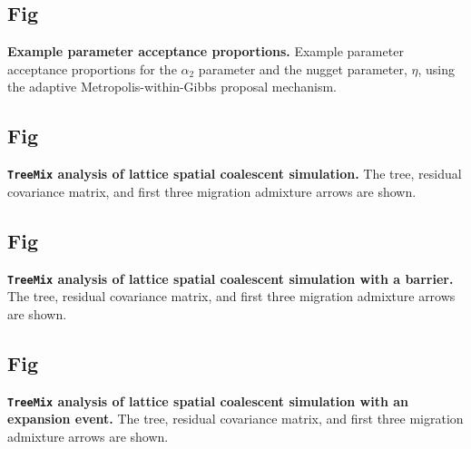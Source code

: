 \documentclass[10pt,letterpaper]{article}
\begin{document}
\subsection{Fig}
\label{sfig:example_acceptance_rates}
{\bf{
Example parameter acceptance proportions.}}
Example parameter acceptance proportions for the $\alpha_2$ parameter and the nugget parameter, 
$\eta$, using the adaptive Metropolis-within-Gibbs proposal mechanism.

\subsection{Fig}
\label{sfig:treemix_lattice}
{\bf{
\texttt{TreeMix} analysis of lattice spatial coalescent simulation.}}  
The tree, residual covariance matrix, and first three migration admixture arrows are shown.

\subsection{Fig}
\label{sfig:treemix_barrier}
{\bf{
\texttt{TreeMix} analysis of lattice spatial coalescent simulation with a barrier.}}
The tree, residual covariance matrix, and first three migration admixture arrows are shown.

\subsection{Fig}
\label{sfig:treemix_expansion}
{\bf{
\texttt{TreeMix} analysis of lattice spatial coalescent simulation with an expansion event.}}
The tree, residual covariance matrix, and first three migration admixture arrows are shown.
\end{document}
